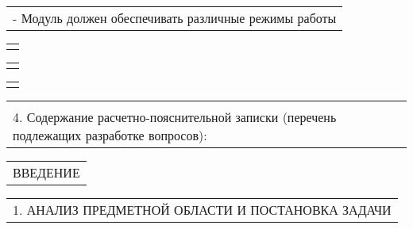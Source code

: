 \documentclass[12pt, А4, twoside]{article}
\begin{document}
\begin{FlushLeft}
		\vspace{-0.1 cm}
		
		\begin{tabular}{p{17.25cm}}
			\hspace{0.6cm} \textsf{- Модуль должен обеспечивать различные режимы работы}\vspace{0pt} \hline 
		\end{tabular}
		
		\begin{tabular}{p{17.25cm}}
			\vspace{0pt} \hline \\
		\end{tabular}
		
		\begin{tabular}{p{17.25cm}}
			\vspace{0pt} \hline \\
		\end{tabular}
		
		\begin{tabular}{p{17.25cm}}
			\vspace{0pt} \hline \\
		\end{tabular}
		
		
		\begin{tabular}{p{17.25cm}}
			\vspace{0pt} \hline \\
			\textsf{4. Содержание расчетно-пояснительной записки (перечень подлежащих разработке вопросов):} \vspace{0pt} \hline \\
		\end{tabular}
		
		\vspace{-0.1 cm}
		
		\begin{tabular}{p{17.25cm}}
			\hspace{0.3cm} \textsf{ВВЕДЕНИЕ} \vspace{0pt} \hline \\
		\end{tabular}
		
		\vspace{-0.1 cm}
		
		\begin{tabular}{p{17.25cm}}
			\hspace{0.3cm} \textsf{1. АНАЛИЗ ПРЕДМЕТНОЙ ОБЛАСТИ И ПОСТАНОВКА ЗАДАЧИ} \vspace{0pt} \hline \\
		\end{tabular}
		

\end{FlushLeft}
\end{document}
